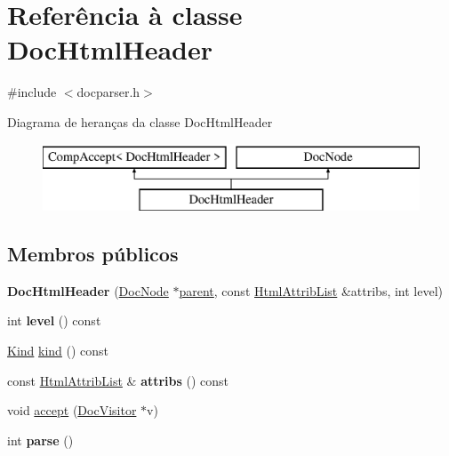 \hypertarget{class_doc_html_header}{\section{Referência à classe Doc\-Html\-Header}
\label{class_doc_html_header}
}


{\ttfamily \#include $<$docparser.\-h$>$}

Diagrama de heranças da classe Doc\-Html\-Header\begin{figure}[H]
\begin{center}
\leavevmode
\includegraphics[height=2.000000cm]{class_doc_html_header}
\end{center}
\end{figure}
\subsection*{Membros públicos}
\begin{DoxyCompactItemize}
\item 
\hypertarget{class_doc_html_header_acfa867a065764f883993028ed324b2b0}{{\bfseries Doc\-Html\-Header} (\hyperlink{class_doc_node}{Doc\-Node} $\ast$\hyperlink{class_doc_node_abd7f070d6b0a38b4da71c2806578d19d}{parent}, const \hyperlink{class_html_attrib_list}{Html\-Attrib\-List} \&attribs, int level)}\label{class_doc_html_header_acfa867a065764f883993028ed324b2b0}

\item 
\hypertarget{class_doc_html_header_a82c2056cb8c65be6ecfc66a160eb3c0f}{int {\bfseries level} () const }\label{class_doc_html_header_a82c2056cb8c65be6ecfc66a160eb3c0f}

\item 
\hyperlink{class_doc_node_aa10c9e8951b8ccf714a59ec321bdac5b}{Kind} \hyperlink{class_doc_html_header_aa9d037bed9f9a083d0cd01485637d843}{kind} () const 
\item 
\hypertarget{class_doc_html_header_aae3c838ea3d3273b35d07e9965a8985e}{const \hyperlink{class_html_attrib_list}{Html\-Attrib\-List} \& {\bfseries attribs} () const }\label{class_doc_html_header_aae3c838ea3d3273b35d07e9965a8985e}

\item 
void \hyperlink{class_doc_html_header_a7ba716e854ae2f8f87a4eb2140e302b6}{accept} (\hyperlink{class_doc_visitor}{Doc\-Visitor} $\ast$v)
\item 
\hypertarget{class_doc_html_header_a67007fc2be130666fbf3b065022756f4}{int {\bfseries parse} ()}\label{class_doc_html_header_a67007fc2be130666fbf3b065022756f4}

\end{DoxyCompactItemize}
